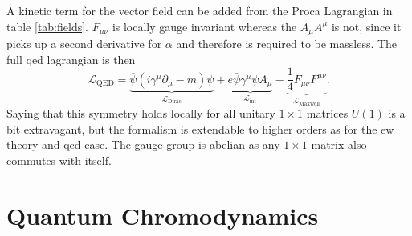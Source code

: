 A kinetic term for the vector field can be added from the Proca Lagrangian in table \ref{tab:fields}. $F_{\mu\nu}$ is locally gauge invariant whereas the $A_\mu A^\mu$ is not, since it picks up a second derivative for $\alpha$ and therefore is required to be massless. The full \ac{qed} lagrangian is then
\begin{equation}
    \mathcal{L}_\mathrm{QED}
    =
    \underbrace{\overline{\psi}(i \gamma^\mu \partial_\mu - m )\psi}_{\mathcal{L}_\mathrm{Dirac} }
    +
    \underbrace{ e\overline{\psi} \gamma^\mu {\psi}A_\mu}_{\mathcal{L}_\mathrm{int}}
    -
    \underbrace{\frac{1}{4}F_{\mu\nu}F^{\mu\nu}}_{\mathcal{L}_\mathrm{Maxwell} }.
    \label{eq:l_qed}
\end{equation}
Saying that this symmetry holds locally for all unitary $1\times1$ matrices $U(1)$ is a bit extravagant, but the formalism is extendable to higher orders as for the \ac{ew} theory and \ac{qcd} case. The gauge group is abelian as any $1\times1$ matrix also commutes with itself.

\section{Quantum Chromodynamics}\label{sec:qcd}

